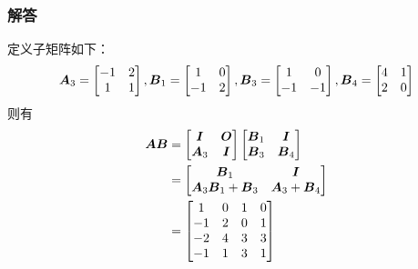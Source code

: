 \documentclass[9pt,xcolor=svgnames]{beamer} %
\begin{document}
\begin{frame}
    \frametitle{解答}
    定义子矩阵如下：
    \begin{equation*}
        \boldsymbol{A}_3=
        \begin{bmatrix}
            -1 & 2 \\1&1
        \end{bmatrix},
        \boldsymbol{B}_1=
        \begin{bmatrix}
            1 & 0 \\-1&2
        \end{bmatrix},
        \boldsymbol{B}_3=
        \begin{bmatrix}
            1 & 0 \\-1&-1
        \end{bmatrix},
        \boldsymbol{B}_4=
        \begin{bmatrix}
            4 & 1 \\2&0
        \end{bmatrix}
    \end{equation*}
    则有
    \begin{align*}
        \boldsymbol{A}\boldsymbol{B} & =
        \begin{bmatrix}
            \boldsymbol{I} & \boldsymbol{O} \\\boldsymbol{A}_3&\boldsymbol{I}
        \end{bmatrix}
        \begin{bmatrix}
            \boldsymbol{B}_1 & \boldsymbol{I} \\\boldsymbol{B}_3&\boldsymbol{B}_4
        \end{bmatrix}                        \\&=
        \begin{bmatrix}
            \boldsymbol{B}_1 & \boldsymbol{I} \\\boldsymbol{A}_3\boldsymbol{B}_1+\boldsymbol{B}_3&\boldsymbol{A}_3+\boldsymbol{B}_4
        \end{bmatrix} \\&=
        \begin{bmatrix}
            1  & 0 & 1 & 0 \\
            -1 & 2 & 0 & 1 \\
            -2 & 4 & 3 & 3 \\
            -1 & 1 & 3 & 1
        \end{bmatrix}
    \end{align*}
\end{frame}
\end{document}

